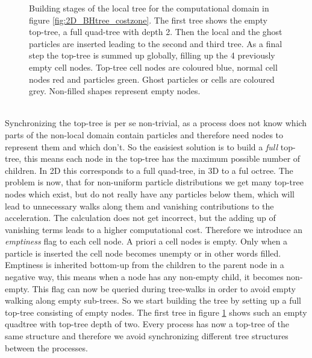 \begin{figure}[htbp]
\begin{center}
\caption{Building stages of the local tree for the computational domain in figure \ref{fig:2D_BHtree_costzone}. The first tree shows the empty top-tree, a full quad-tree with depth 2. Then the local and the ghost particles are inserted leading to the second and third tree. As a final step the top-tree is summed up globally, filling up the 4 previously empty cell nodes. Top-tree cell nodes are coloured blue, normal cell nodes red and particles green. Ghost particles or cells are coloured grey. Non-filled shapes represent empty nodes.}
\label{fig:2D_BHtree_building}
\end{center}
\end{figure}\\

Synchronizing the top-tree is per se non-trivial, as a process does not know which parts of the non-local domain contain particles and therefore need nodes to represent them and which don't. So the easisiest solution is to build a \emph{full} top-tree, this means each node in the top-tree has the maximum possible number of children. In 2D this corresponds to a full quad-tree, in 3D to a ful octree. The problem is now, that for non-uniform particle distributions we get many top-tree nodes which exist, but do not really have any particles below them, which will lead to unnecessary walks along them and vanishing contributions to the acceleration. The calculation does not get incorrect, but the adding up of vanishing terms leads to a higher computational cost. Therefore we introduce an \emph{emptiness} flag to each cell node. A priori a cell nodes is empty. Only when a particle is inserted the cell node becomes unempty or in other words filled. Emptiness is inherited bottom-up from the children to the parent node in a negative way, this means when a node has any non-empty child, it becomes non-empty. This flag can now be queried during tree-walks in order to avoid empty walking along empty sub-trees. So we start building the tree by setting up a full top-tree consisting of empty nodes. The first tree in figure \ref{fig:2D_BHtree_building} shows such an empty quadtree with top-tree depth of two. Every process has now a top-tree of the same structure and therefore we avoid synchronizing different tree structures between the processes.\\


